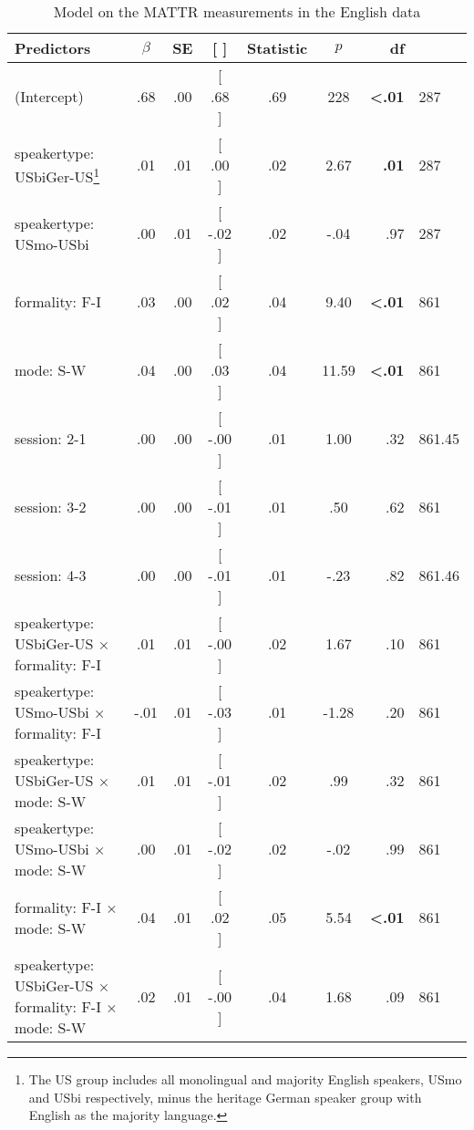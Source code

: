 \documentclass[output=paper,colorlinks,citecolor=brown]{langscibook}
\begin{document}
\begin{sidewaystable}
    \small
    \robustify\bfseries
    \caption{Model on the MATTR measurements in the English data}
    \begin{tabular}{l S[table-format=-1.2]
                      S[table-format=1.2]
                      >{[}S[table-format={[}-1.2]
                      @{, }
                      S[table-format=-1.2{]}]<{]}
                      S[table-format=3.2]
                      S[table-format=<1.2]
                      r
                    }
        \lsptoprule
        {Predictors} & {$\beta$} & {SE} &  & {Statistic} & {$p$} & {df} \\ \midrule
        (Intercept) & .68 & .00 & .68 & .69 & 228 & \bfseries <.01 & 287 \\ 
        speakertype: USbiGer-US\footnote{The US group includes all monolingual and majority English speakers, USmo and USbi respectively, minus the heritage German speaker group with English as the majority language.} 
                               & .01 & .01 & .00 & .02 & 2.67 & \bfseries .01 & 287 \\ 
        speakertype: USmo-USbi & .00 & .01 & -.02 & .02 & -.04 & .97 & 287 \\
        formality: F-I & .03 & .00 & .02 & .04 & 9.40 & \bfseries <.01 & 861 \\ 
        mode: S-W & .04 & .00 & .03 & .04 & 11.59 & \bfseries <.01 & 861 \\
        session: 2-1 & .00 & .00 & -.00 & .01 & 1.00 & .32 & 861.45 \\
        session: 3-2 & .00 & .00 & -.01 & .01 & .50 & .62 & 861 \\
        session: 4-3 & .00 & .00 & -.01 & .01 & -.23 & .82 & 861.46 \\
        speakertype: USbiGer-US × formality: F-I& .01 & .01 & -.00 & .02 & 1.67 & .10 & 861 \\
        speakertype: USmo-USbi × formality: F-I& -.01 & .01 & -.03 & .01 & -1.28 & .20 & 861 \\
        speakertype: USbiGer-US × mode: S-W  & .01 & .01 & -.01 & .02 & .99 & .32 & 861 \\ 
        speakertype: USmo-USbi × mode: S-W & .00 & .01 & -.02 & .02 & -.02 & .99 & 861 \\
        formality: F-I × mode: S-W  & .04 & .01 & .02 & .05 & 5.54 & \bfseries <.01 & 861 \\
        speakertype: USbiGer-US × formality: F-I × mode: S-W & .02 & .01 & -.00 & .04 & 1.68 & .09 & 861 \\ 

\end{tabular}
\end{sidewaystable}
\end{document}
